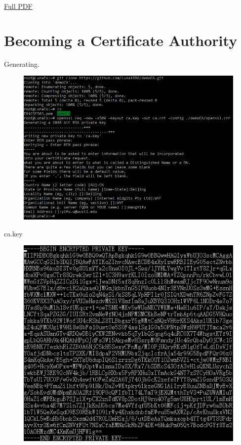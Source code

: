 \documentclass{article}
\begin{document}
\maketitle

\href{https://github.com/Luna1996/WUSTL/blob/master/571/L4/L4.pdf}{Full PDF}

\section{Becoming a Certificate Authority}
Generating.
\begin{figure}[H]\centering\includegraphics[width=\textwidth]{1-1.png}\end{figure}
ca.key
\begin{figure}[H]\centering\includegraphics{1-2.png}\end{figure}
\end{document}
